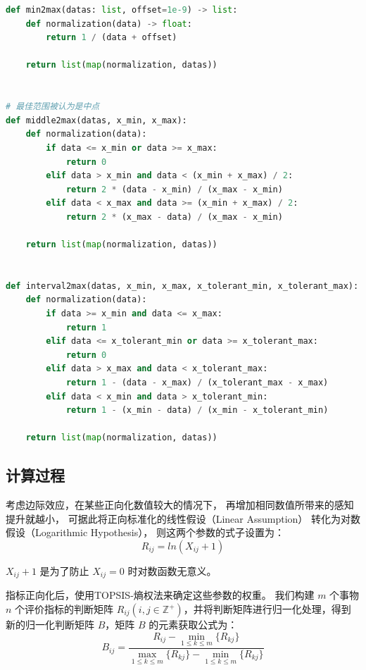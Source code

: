 \begin{lstlisting}[language=python]
def min2max(datas: list, offset=1e-9) -> list:
    def normalization(data) -> float:
        return 1 / (data + offset)

    return list(map(normalization, datas))


# 最佳范围被认为是中点
def middle2max(datas, x_min, x_max):
    def normalization(data):
        if data <= x_min or data >= x_max:
            return 0
        elif data > x_min and data < (x_min + x_max) / 2:
            return 2 * (data - x_min) / (x_max - x_min)
        elif data < x_max and data >= (x_min + x_max) / 2:
            return 2 * (x_max - data) / (x_max - x_min)

    return list(map(normalization, datas))


def interval2max(datas, x_min, x_max, x_tolerant_min, x_tolerant_max):
    def normalization(data):
        if data >= x_min and data <= x_max:
            return 1
        elif data <= x_tolerant_min or data >= x_tolerant_max:
            return 0
        elif data > x_max and data < x_tolerant_max:
            return 1 - (data - x_max) / (x_tolerant_max - x_max)
        elif data < x_min and data > x_tolerant_min:
            return 1 - (x_min - data) / (x_min - x_tolerant_min)

    return list(map(normalization, datas))
\end{lstlisting}

\subsection{计算过程}

考虑边际效应，在某些正向化数值较大的情况下，
再增加相同数值所带来的感知提升就越小，
可据此将正向标准化的线性假设（Linear Assumption）
转化为对数假设（Logarithmic Hypothesis），
则这两个参数的式子设置为：
\begin{equation}
    R_{ij} = ln(X_{ij} + 1)
\end{equation}

$X_{ij} + 1$ 是为了防止 $X_{ij} = 0$ 时对数函数无意义。

指标正向化后，使用TOPSIS-熵权法来确定这些参数的权重。
我们构建 $m$ 个事物 $n$ 个评价指标的判断矩阵 $R_{ij}(i, j \in \mathbb{Z}^+)$，并将判断矩阵进行归一化处理，得到新的归一化判断矩阵 $B$，矩阵 $B$ 的元素获取公式为：
\begin{equation}
    B_{ij} = \frac{R_{ij} - \min_{1 \le k \le m}\{R_{kj}\}}{\max_{1 \le k \le m}\{R_{kj}\} - \min_{1 \le k \le m}\{R_{kj}\}}
\end{equation}

